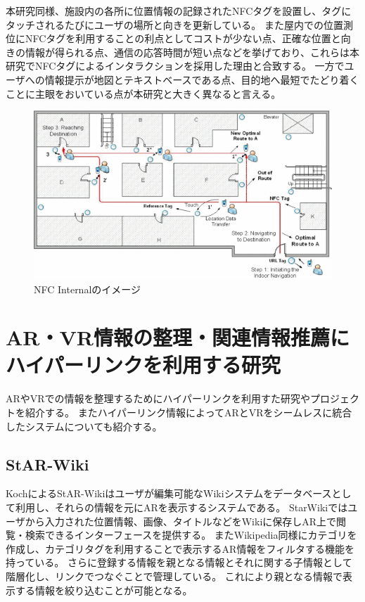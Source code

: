 本研究同様、施設内の各所に位置情報の記録されたNFCタグを設置し、タグにタッチされるたびにユーザの場所と向きを更新している。
また屋内での位置測位にNFCタグを利用することの利点としてコストが少ない点、正確な位置と向きの情報が得られる点、通信の応答時間が短い点などを挙げており、これらは本研究でNFCタグによるインタラクションを採用した理由と合致する。
一方でユーザへの情報提示が地図とテキストベースである点、目的地へ最短でたどり着くことに主眼をおいている点が本研究と大きく異なると言える。

\begin{figure}[H]
  \centering 
  \includegraphics[width=150mm]{images/NFC_Internal.png}
  \caption{NFC Internalのイメージ} \label{fig:NFC_Internal}
\end{figure}



\section{AR・VR情報の整理・関連情報推薦にハイパーリンクを利用する研究}
ARやVRでの情報を整理するためにハイパーリンクを利用すた研究やプロジェクトを紹介する。
またハイパーリンク情報によってARとVRをシームレスに統合したシステムについても紹介する。

\subsection{StAR-Wiki}
KochによるStAR-Wiki\cite{Koch2014StARWikiA}はユーザが編集可能なWikiシステムをデータベースとして利用し、それらの情報を元にARを表示するシステムである。
StarWikiではユーザから入力された位置情報、画像、タイトルなどをWikiに保存しAR上で閲覧・検索できるインターフェースを提供する。
またWikipedia同様にカテゴリを作成し、カテゴリタグを利用することで表示するAR情報をフィルタする機能を持っている。
さらに登録する情報を親となる情報とそれに関する子情報として階層化し、リンクでつなぐことで管理している。
これにより親となる情報で表示する情報を絞り込むことが可能となる。


